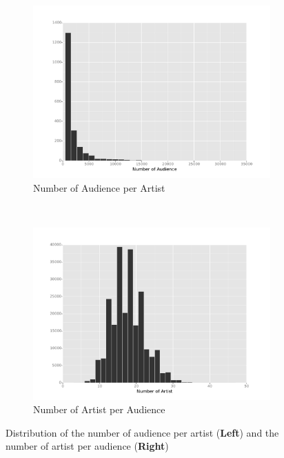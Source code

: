 \documentclass[11pt]{article}
\theoremstyle{definition}
\begin{document}
\begin{figure}[!h]
        \centering
        \begin{subfigure}[b]{0.3\textwidth}
                \includegraphics[width=\textwidth]{"./plots/hist_arts"}
                \caption{Number of Audience per Artist}
        \end{subfigure}%
        ~
        \begin{subfigure}[b]{0.3\textwidth}
                \includegraphics[width=\textwidth]{"./plots/hist_user"}
                \caption{Number of Artist per Audience}
        \end{subfigure}
        \caption{Distribution of the number of audience per artist (\textbf{Left}) and the number of artist per audience (\textbf{Right})}
        \label{fig:freq}
\end{figure}
\end{document}
